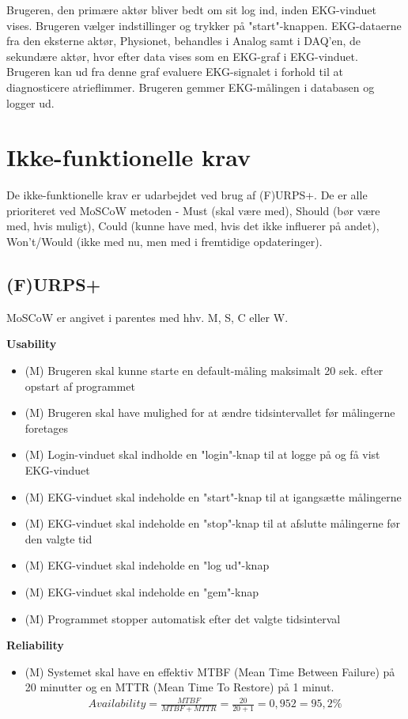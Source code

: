 Brugeren, den primære aktør bliver bedt om sit log ind, inden EKG-vinduet vises. Brugeren vælger indstillinger og trykker på "start"-knappen. EKG-dataerne fra den eksterne aktør, Physionet, behandles i Analog samt i DAQ'en, de sekundære aktør, hvor efter data vises som en EKG-graf i EKG-vinduet. Brugeren kan ud fra denne graf evaluere EKG-signalet i forhold til at diagnosticere atrieflimmer. Brugeren gemmer EKG-målingen i databasen og logger ud.  

\section{Ikke-funktionelle krav}
De ikke-funktionelle krav er udarbejdet ved brug af (F)URPS+. De er alle prioriteret ved MoSCoW metoden - Must (skal være med), Should (bør være med, hvis muligt), Could (kunne have med, hvis det ikke influerer på andet), Won't/Would (ikke med nu, men med i fremtidige opdateringer). 

\subsection{(F)URPS+}
MoSCoW er angivet i parentes med hhv. M, S, C eller W.

\textbf{Usability}
\begin{itemize}
	\item (M) Brugeren skal kunne starte en default-måling maksimalt 20 sek. efter opstart af programmet
	\item (M) Brugeren skal have mulighed for at ændre tidsintervallet før målingerne foretages
	\item (M) Login-vinduet skal indholde en "login"-knap til at logge på og få vist EKG-vinduet
	\item (M) EKG-vinduet skal indeholde en "start"-knap til at igangsætte målingerne
	\item (M) EKG-vinduet  skal indeholde en "stop"-knap til at afslutte målingerne før den valgte tid
	\item (M) EKG-vinduet skal indeholde en "log ud"-knap
	\item (M) EKG-vinduet  skal indeholde en "gem"-knap
	\item (M) Programmet stopper automatisk efter det valgte tidsinterval
\end{itemize}

\textbf{Reliability}
\begin{itemize}
	\item (M) Systemet skal have en effektiv MTBF (Mean Time Between Failure) på 20 minutter og en MTTR (Mean Time To Restore) på 1 minut.
				\begin{align}
					Availability = \frac{MTBF}{MTBF+MTTR} = \frac{20}{20+1} = 0,952 = 95,2 \%
				\end{align}

\end{itemize}

